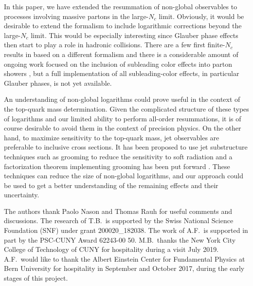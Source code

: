 \documentclass[11pt,a4paper]{article}
\begin{document}
In this paper, we have extended the resummation of non-global observables to processes involving massive partons in the large-$N_c$ limit. 
Obviously, it would be desirable to extend the formalism to include logarithmic corrections beyond the large-$N_c$ limit.
This would be especially interesting since Glauber phase effects then start to play a role in hadronic collisions. There are a few first finite-$N_c$ results in \cite{Hatta:2013iba,Hagiwara:2015bia} based on a different formalism \cite{Weigert:2003mm} and there is a considerable amount of ongoing work focused on the inclusion of subleading color effects into parton showers \cite{Platzer:2013fha, Platzer:2012np, Nagy:2015hwa, Martinez:2018ffw, Isaacson:2018zdi, Nagy:2019pjp, Forshaw:2019ver, Hoeche:2020nsx, Forshaw:2020wrq}, but a full implementation of all subleading-color effects, in particular Glauber phases, is not yet available.

An understanding of non-global logarithms could prove useful in the context of the top-quark mass determination. Given the complicated structure of these types of logarithms and our limited ability to perform all-order resummations, it is of course desirable to avoid them in the context of precision physics. On the other hand, to maximize sensitivity to the top-quark mass, jet observables are preferable to inclusive cross sections. It has been proposed to use jet substructure techniques such as grooming to reduce the sensitivity to soft radiation \cite{Andreassen:2017ugs} and a factorization theorem implementing grooming has been put forward  \cite{Hoang:2017kmk}. These techniques can reduce the size of non-global logarithms, and our approach could be used to get a better understanding of the remaining effects and their uncertainty.



\begin{acknowledgments}	
The authors thank Paolo Nason and Thomas Rauh for useful comments and discussions. The research of T.B.\ is supported by the Swiss National Science Foundation (SNF) under grant 200020\_182038. The work of A.F.\ is supported in part by the PSC-CUNY Award 62243-00 50. M.B.\ thanks the New York City College of Technology of CUNY for hospitality during a visit July 2019. A.F.\ would like to thank  the Albert Einstein Center for Fundamental Physics at Bern University for hospitality in September and October 2017, during the early stages of this project.
\end{acknowledgments}  

\newpage
\end{document}
